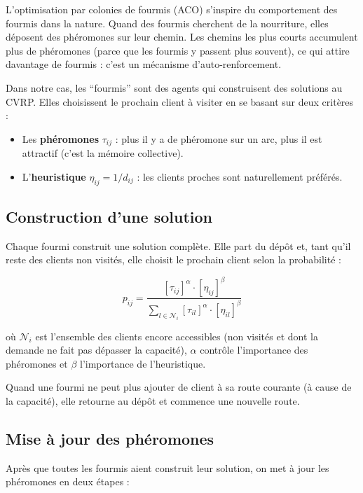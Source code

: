 \documentclass[12pt, a4paper]{article}
\begin{document}
L'optimisation par colonies de fourmis (ACO) s'inspire du comportement des fourmis dans la nature. Quand des fourmis cherchent de la nourriture, elles déposent des phéromones sur leur chemin. Les chemins les plus courts accumulent plus de phéromones (parce que les fourmis y passent plus souvent), ce qui attire davantage de fourmis : c'est un mécanisme d'auto-renforcement.

Dans notre cas, les ``fourmis'' sont des agents qui construisent des solutions au CVRP. Elles choisissent le prochain client à visiter en se basant sur deux critères :

\begin{itemize}
    \item Les \textbf{phéromones} $\tau_{ij}$ : plus il y a de phéromone sur un arc, plus il est attractif (c'est la mémoire collective).
    \item L'\textbf{heuristique} $\eta_{ij} = 1/d_{ij}$ : les clients proches sont naturellement préférés.
\end{itemize}

\subsection{Construction d'une solution}

Chaque fourmi construit une solution complète. Elle part du dépôt et, tant qu'il reste des clients non visités, elle choisit le prochain client selon la probabilité :

\begin{equation}
    p_{ij} = \frac{[\tau_{ij}]^\alpha \cdot [\eta_{ij}]^\beta}{\sum_{l \in \mathcal{N}_i} [\tau_{il}]^\alpha \cdot [\eta_{il}]^\beta}
\end{equation}

où $\mathcal{N}_i$ est l'ensemble des clients encore accessibles (non visités et dont la demande ne fait pas dépasser la capacité), $\alpha$ contrôle l'importance des phéromones et $\beta$ l'importance de l'heuristique.

Quand une fourmi ne peut plus ajouter de client à sa route courante (à cause de la capacité), elle retourne au dépôt et commence une nouvelle route.

\subsection{Mise à jour des phéromones}

Après que toutes les fourmis aient construit leur solution, on met à jour les phéromones en deux étapes :
\end{document}
